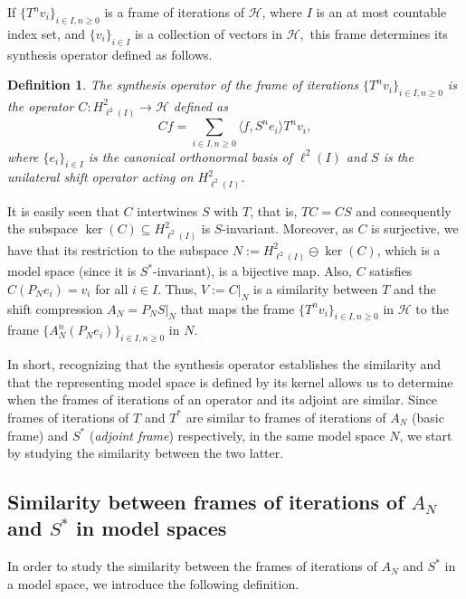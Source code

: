 \documentclass[a4paper,12pt]{amsart}
\def\HH{{\mathcal{H}}}
\newtheorem{definition}[theorem]{Definition}
\theoremstyle{definition}
\begin{document}
If $\{T^nv_i\}_{i\in I,n\geqslant0}$ is a frame of iterations of $\HH$, where
$I$ is an at most countable index set, and $\{v_i\}_{i\in I}$ is a collection of vectors in $\HH,$ this frame determines its synthesis operator defined as follows.

\begin{definition}\label{synthesis}
The  synthesis operator of the frame of iterations $\{T^n v_i\}_{i\in I,n\geqslant0}$ is the operator $C:H^2_{\ell^2(I)}\to\HH$ defined as
\begin{equation*}
Cf=\sum_{i\in I,n\geqslant0}\langle f,S^ne_i\rangle T^nv_i,
\end{equation*}
where $\{e_i\}_{i\in I}$ is the canonical orthonormal basis of $\ell^2(I)$ and $S$ is the unilateral shift operator acting on $H^2_{\ell^2(I)}$. 
\end{definition}

It is easily seen that $C$ intertwines $S$ with $T$, that is, $T C=C S$ and consequently the subspace $\ker(C)\subseteq H^2_{\ell^2(I)}$ is $S$-invariant. Moreover, as $C$ is surjective, we have that its restriction to the subspace $N:=H^{2}_{\ell^2(I)}\ominus\ker(C)$, which is a model space (since it is $S^*$-invariant), is a bijective map. Also, $C$ satisfies $C(P_Ne_i)=v_i$ for all $i\in I$. Thus, $V:=C|_N$ is a similarity between $T$ and the shift compression $A_N=P_NS|_N$ that maps the frame $\{T^nv_i\}_{i\in I,n\geqslant0}$ in $\HH$ to the frame $\{A_N^n(P_Ne_i)\}_{i\in I,n\geqslant0}$ in $N$.



In short, recognizing that the synthesis operator establishes the similarity and that the representing model space is defined by its kernel allows us to determine when the frames of iterations of an operator and its adjoint are similar. Since frames of iterations of $T$ and $T^*$ are similar to frames of iterations of $A_{N}$ (basic frame) and $S^*$ (\textit{adjoint frame}) respectively, in the same model space $N$, we start by studying the similarity between the two latter.

\subsection{Similarity between frames of iterations of \texorpdfstring{$A_{N}$}{AN} and \texorpdfstring{$S^*$}{S*} in model spaces}

In order to study the similarity between the frames of iterations of $A_N$ and $S^*$ in a model space, we introduce the following definition.
\end{document}
